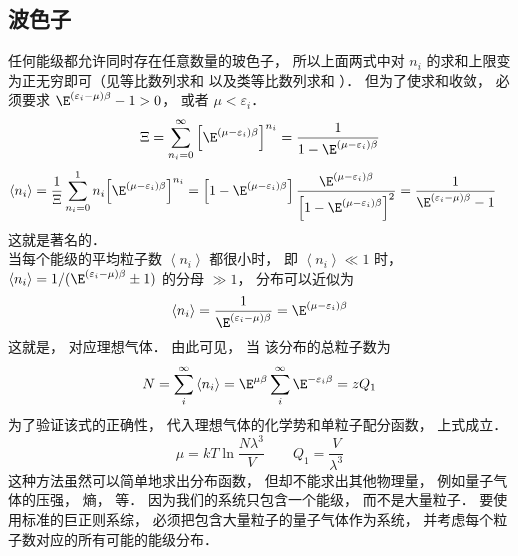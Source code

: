 \subsection{波色子} 
任何能级都允许同时存在任意数量的玻色子， 所以上面两式中对 ${n_i}$ 的求和上限变为正无穷即可（见等比数列求和%
以及类等比数列求和%
）． 但为了使求和收敛， 必须要求 ${\E^{\left( {{\varepsilon_i} - \mu } \right)\beta }} - 1 > 0$，  或者 $\mu  < {\varepsilon_i}$． 
\begin{equation}
  \Xi  = \sum\limits_{{n_i} = 0}^\infty  {{{\left[ {{\E^{\left( {\mu  - {\varepsilon_i}} \right)\beta }}} \right]}^{{n_i}}}}  = \frac{1}{{1 - {\E^{\left( {\mu  - {\varepsilon_i}} \right)\beta }}}}
\end{equation}
\begin{equation}
\begin{aligned}
  \left\langle {{n_i}} \right\rangle & = \frac{1}{\Xi }\sum\limits_{{n_i} = 0}^1 {{n_i}{{\left[ {{\E^{\left( {\mu  - {\varepsilon_i}} \right)\beta }}} \right]}^{{n_i}}}} = \left[ {1 - {\E^{\left( {\mu  - {\varepsilon_i}} \right)\beta }}} \right]\frac{{{\E^{\left( {\mu  - {\varepsilon_i}} \right)\beta }}}}{{{{\left[ {1 - {\E^{\left( {\mu  - {\varepsilon_i}} \right)\beta }}} \right]}^2}}}  = \frac{1}{{{\E^{\left( {{\varepsilon_i} - \mu } \right)\beta }} - 1}}
  \end{aligned}
\end{equation}
这就是著名的．\\
当每个能级的平均粒子数 $\left\langle {{n_i}} \right\rangle $ 都很小时， 即 $\left\langle {{n_i}} \right\rangle \ll 1$ 时， $\left\langle {{n_i}} \right\rangle  = {1}/({{{\E^{\left( {{\varepsilon_i} - \mu } \right)\beta }} \pm 1}})$ 的分母 $ \gg 1$，  分布可以近似为
\begin{equation}
  \left\langle {{n_i}} \right\rangle  = \frac{1}{{{\E^{\left( {{\varepsilon_i} - \mu } \right)\beta }}}} = {\E^{\left( {\mu  - {\varepsilon_i}} \right)\beta }}
\end{equation}
这就是， 对应理想气体． 由此可见， 当 %
该分布的总粒子数为
\begin{equation}
  N = \sum\limits_i^\infty  {\left\langle {{n_i}} \right\rangle }  = {\E^{\mu \beta }}\sum\limits_i^\infty  {{\E^{ - {\varepsilon_i}\beta }}}  = z{Q_1}
\end{equation}
为了验证该式的正确性， 代入理想气体的化学势和单粒子配分函数， 上式成立．
\begin{equation}
  \mu  = kT\ln \frac{{N{\lambda ^3}}}{V} 
  \qquad
  {Q_1} = \frac{V}{{{\lambda ^3}}}
\end{equation}
这种方法虽然可以简单地求出分布函数， 但却不能求出其他物理量， 例如量子气体的压强， 熵， 等． 因为我们的系统只包含一个能级， 而不是大量粒子． 要使用标准的巨正则系综， 必须把包含大量粒子的量子气体作为系统， 并考虑每个粒子数对应的所有可能的能级分布．\\